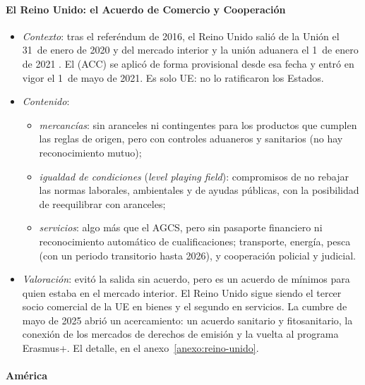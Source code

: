 \documentclass[11pt]{article}
\begin{document}
\paragraph{El Reino Unido: el Acuerdo de Comercio y Cooperación}\label{sec:reino-unido}

\begin{itemize}
\item \emph{Contexto}: tras el referéndum de 2016, el Reino Unido salió de la Unión el 31~de enero de 2020 y del mercado interior y la unión aduanera el 1~de enero de 2021 . El  (ACC) se aplicó de forma provisional desde esa fecha y entró en vigor el 1~de mayo de 2021. Es solo UE: no lo ratificaron los Estados.
\item \emph{Contenido}:
  \begin{itemize}
  \item \emph{mercancías}: sin aranceles ni contingentes para los productos que cumplen las reglas de origen, pero con controles aduaneros y sanitarios (no hay reconocimiento mutuo);
  \item \emph{igualdad de condiciones} (\emph{level playing field}): compromisos de no rebajar las normas laborales, ambientales y de ayudas públicas, con la posibilidad de reequilibrar con aranceles;
  \item \emph{servicios}: algo más que el AGCS, pero sin pasaporte financiero ni reconocimiento automático de cualificaciones; transporte, energía, pesca (con un periodo transitorio hasta 2026), y cooperación policial y judicial.
  \end{itemize}
\item \emph{Valoración}: evitó la salida sin acuerdo, pero es un acuerdo de mínimos para quien estaba en el mercado interior. El Reino Unido sigue siendo el tercer socio comercial de la UE en bienes y el segundo en servicios. La cumbre de mayo de 2025 abrió un acercamiento: un acuerdo sanitario y fitosanitario, la conexión de los mercados de derechos de emisión y la vuelta al programa Erasmus+\nocite{CE2026ReinoUnido}. El detalle, en el anexo~\ref{anexo:reino-unido}.
\end{itemize}

\paragraph{América}
\end{document}
